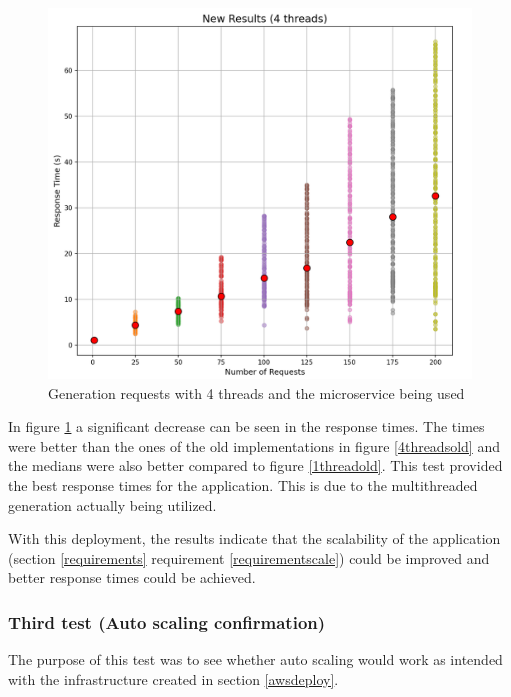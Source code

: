 				\begin{figure}[h]
					\begin{center}
						\includegraphics[scale=0.6]{include/imgs/4threads_new.PNG}
						\caption{Generation requests with 4 threads and the microservice being used}
						\label{4threadsnew}
					\end{center}
				\end{figure}

				In figure \ref{4threadsnew} a significant decrease can be seen in the response times. 
				The times were better than the ones of the old implementations in figure 
				\ref{4threadsold} and the medians were also better compared to figure \ref{1threadold}.
				This test provided the best response times for the application.
				This is due to the multithreaded generation actually being utilized.

				With this deployment, the results indicate that the scalability of the application (section \ref{requirements} requirement 
				\ref{requirementscale}) could be improved 
				and better response times could be achieved.


			\subsubsection{Third test (Auto scaling confirmation)} \label{testthree}
				The purpose of this test was to see whether auto scaling would work as intended with the infrastructure created in 
				section \ref{awsdeploy}.

